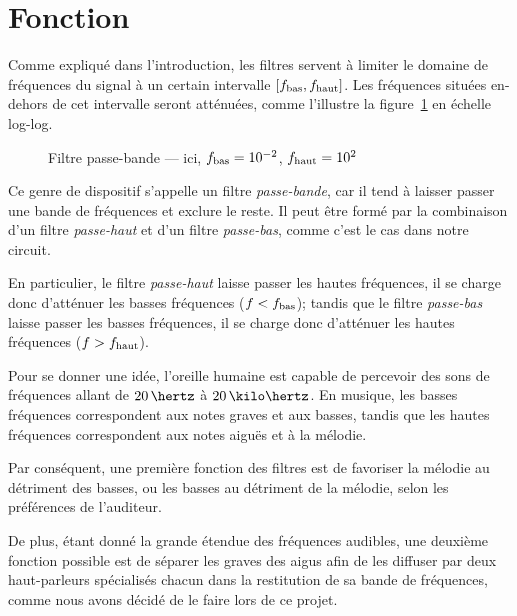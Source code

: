 \section{Fonction}

Comme expliqué dans l'introduction, les filtres servent à limiter
le domaine de fréquences du signal à un certain intervalle
$[f_{\mathrm{bas}},f_{\mathrm{haut}}]$.
Les fréquences situées en-dehors de cet intervalle seront atténuées,
comme l'illustre la figure~\ref{fig:filtre-ideal} en échelle log-log.

\begin{figure}[h!]
    \centering
    \caption{Filtre passe-bande --- ici, $f_{\mathrm{bas}}=10^{-2}$, $f_{\mathrm{haut}}=10^2$}
    \label{fig:filtre-ideal}
\end{figure}

Ce genre de dispositif s'appelle un filtre \emph{passe-bande},
car il tend à laisser passer une bande de fréquences et exclure le reste.
\cite{highpass-def}
Il peut être formé par la combinaison d'un filtre
\emph{passe-haut} et d'un filtre \emph{passe-bas}, \cite{high-low-pass-combined}
comme c'est le cas dans notre circuit.

En particulier,
le filtre \emph{passe-haut} laisse passer les hautes fréquences,
il se charge donc d'atténuer les basses fréquences ($f<f_{\mathrm{bas}}$);
tandis que le filtre \emph{passe-bas} laisse passer les basses fréquences,
il se charge donc d'atténuer les hautes fréquences ($f>f_{\mathrm{haut}}$).

Pour se donner une idée,
l'oreille humaine est capable de percevoir des sons de fréquences
allant de $20\,\hertz$ à $20\,\kilo\hertz$. \cite{hearing-range}
En musique, les basses fréquences correspondent aux notes graves et aux basses,
tandis que les hautes fréquences correspondent aux notes aiguës et
à la mélodie.

Par conséquent, une première fonction des filtres est de
favoriser la mélodie au détriment des
basses, ou les basses au détriment de la mélodie, selon les préférences
de l'auditeur.

De plus, étant donné la grande étendue des fréquences audibles,
une deuxième fonction possible est de séparer les graves des aigus
afin de les diffuser par deux haut-parleurs spécialisés chacun
dans la restitution de sa bande de fréquences,
comme nous avons décidé de le faire lors de ce projet.

